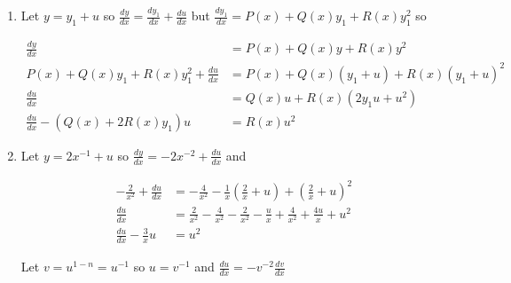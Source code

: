 \documentclass{article}
\begin{document}
\begin{enumerate}
  \item Let $y = y_1 + u$ so $\frac{dy}{dx} = \frac{dy_1}{dx} + \frac{du}{dx}$ but $\frac{dy_1}{dx} = P(x) + Q(x) y_1 + R(x) y_1^2$ so

        \begin{align*}
          \frac{dy}{dx}                                & = P(x) + Q(x) y + R(x) y^2                 \\
          P(x) + Q(x) y_1 + R(x) y_1^2 + \frac{du}{dx} & = P(x) + Q(x) (y_1 + u) + R(x) (y_1 + u)^2 \\
          \frac{du}{dx}                                & = Q(x) u + R(x) (2 y_1 u + u^2)            \\
          \frac{du}{dx} - (Q(x) + 2 R(x) y_1) u        & = R(x) u^2
        \end{align*}

  \item

        Let $y = 2 x^{-1} + u$ so $\frac{dy}{dx} = -2 x^{-2} + \frac{du}{dx}$ and

        \begin{align*}
          -\frac{2}{x^2} + \frac{du}{dx} & = -\frac{4}{x^2} - \frac{1}{x} \left( \frac{2}{x} + u \right) + \left( \frac{2}{x} + u \right)^2    \\
          \frac{du}{dx}                  & = \frac{2}{x^2} - \frac{4}{x^2} - \frac{2}{x^2} - \frac{u}{x} + \frac{4}{x^2} + \frac{4 u}{x} + u^2 \\
          \frac{du}{dx} - \frac{3}{x} u  & = u^2
        \end{align*}

        Let $v = u^{1 - n} = u^{-1}$ so $u = v^{-1}$ and $\frac{du}{dx} = -v^{-2} \frac{dv}{dx}$


\end{enumerate}
\end{document}
